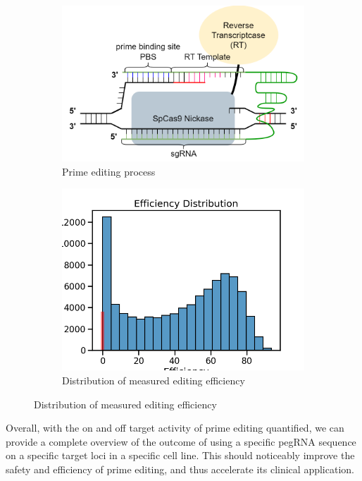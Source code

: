 \documentclass[a4,12pt]{article}
\begin{document}
\begin{figure}
    \centering
    \begin{subfigure}{0.4\textwidth}
        \includegraphics[width=\textwidth]{prime-editing-process.png}
        \caption{Prime editing process}
        \label{fig:prime-editing-process}
    \end{subfigure}
    \begin{subfigure}{0.3\textwidth}
        \includegraphics[width=\textwidth]{efficiency_distribution.png}
        \caption{Distribution of measured editing efficiency}
    \end{subfigure}
\end{figure}

Overall, with the on and off target activity of prime editing quantified, we can provide a complete overview of the outcome of using a specific pegRNA sequence on a specific target loci in a specific cell line. This should noticeably improve the safety and efficiency of prime editing, and thus accelerate its clinical application.

\printbibliography
\end{document}
